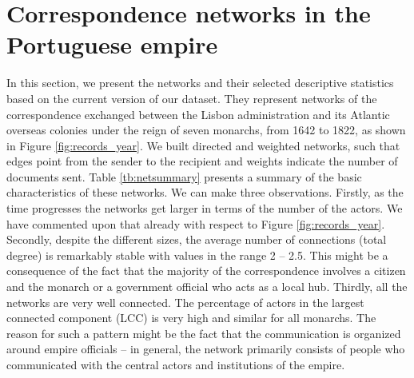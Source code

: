 \documentclass{article}
\begin{document}


\section{Correspondence networks in the Portuguese empire}

In this section, we present the networks and their selected descriptive statistics based on the current version of our dataset. They represent networks of the correspondence exchanged between the Lisbon administration and its Atlantic overseas colonies under the reign of seven monarchs, from 1642 to 1822, as shown in Figure \ref{fig:records_year}. We built directed and weighted networks, such that edges point from the sender to the recipient and weights indicate the number of documents sent. Table \ref{tb:netsummary} presents a summary of the basic characteristics of these networks. We can make three observations. Firstly, as the time progresses the networks get larger in terms of the number of the actors. We have commented upon that already with respect to Figure \ref{fig:records_year}. Secondly, despite the different sizes, the average number of connections (total degree) is remarkably stable with values in the range 2 -- 2.5. This might be a consequence of the fact that the majority of the correspondence involves a citizen and the monarch or a government official who acts as a local hub. Thirdly, all the networks are very well connected. The percentage of actors in the largest connected component (LCC) is very high and similar for all monarchs. The reason for such a pattern might be the fact that the communication is organized around empire officials -- in general, the network primarily consists of people who communicated with the central actors and institutions of the empire.
\end{document}
